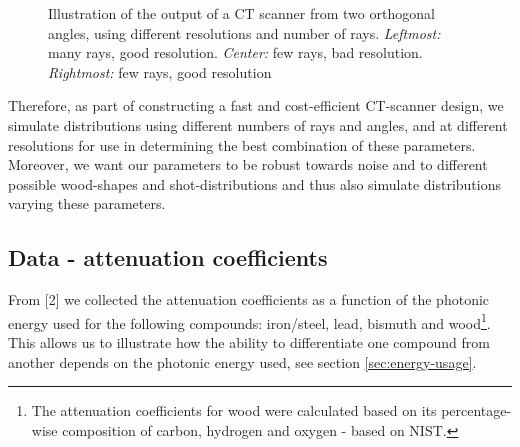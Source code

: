 \documentclass{article}
\begin{document}
\begin{figure}[htbp]
    \captionsetup{justification=centering}
    \caption[]{\small Illustration of the output of a CT scanner from two orthogonal angles, using different resolutions and number of rays. \emph{Leftmost:} many rays, good resolution. \emph{Center:} few rays, bad resolution. \emph{Rightmost:} few rays, good resolution}
    \label{fig:tikz-pictures}
\end{figure} 
Therefore, as part of constructing a fast and cost-efficient CT-scanner design, we simulate distributions using different numbers of rays and angles, and at different resolutions for use in determining the best combination of these parameters. Moreover, we want our parameters to be robust towards noise and to different possible wood-shapes and shot-distributions and thus also simulate distributions varying these parameters.

\subsection{Data - attenuation coefficients} \label{NISTDATA}
From [2] we collected the attenuation coefficients as a function of the photonic energy used for the following compounds: iron/steel, lead, bismuth and wood\footnote{The attenuation coefficients for wood were calculated based on its percentage-wise composition of carbon, hydrogen and oxygen - based on NIST.}. This allows us to illustrate how the ability to differentiate one compound from another depends on the photonic energy used, see section \ref{sec:energy-usage}.

\end{document}
